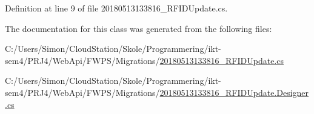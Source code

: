 Definition at line 9 of file 20180513133816\+\_\+\+R\+F\+I\+D\+Update.\+cs.



The documentation for this class was generated from the following files\+:\begin{DoxyCompactItemize}
\item 
C\+:/\+Users/\+Simon/\+Cloud\+Station/\+Skole/\+Programmering/ikt-\/sem4/\+P\+R\+J4/\+Web\+Api/\+F\+W\+P\+S/\+Migrations/\mbox{\hyperlink{20180513133816___r_f_i_d_update_8cs}{20180513133816\+\_\+\+R\+F\+I\+D\+Update.\+cs}}\item 
C\+:/\+Users/\+Simon/\+Cloud\+Station/\+Skole/\+Programmering/ikt-\/sem4/\+P\+R\+J4/\+Web\+Api/\+F\+W\+P\+S/\+Migrations/\mbox{\hyperlink{20180513133816___r_f_i_d_update_8_designer_8cs}{20180513133816\+\_\+\+R\+F\+I\+D\+Update.\+Designer.\+cs}}\end{DoxyCompactItemize}
